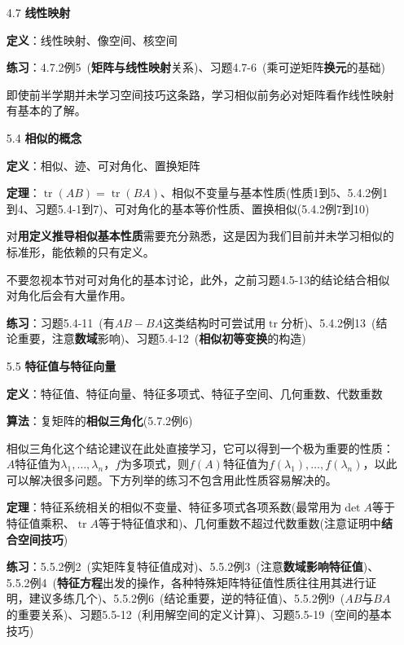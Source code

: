 \documentclass[a4paper,UTF8,fontset=windows]{ctexart}
\DeclareMathOperator{\tr}{tr}
\newcommand*{\note}{\noindent *}
\begin{document}
\begin{enumerate}
    \item[4.7] \textbf{线性映射}
    
    \textbf{定义}：线性映射、像空间、核空间

    \textbf{练习}：4.7.2例5\ (\textbf{矩阵与线性映射}关系)、习题4.7-6\ (乘可逆矩阵\textbf{换元}的基础)

    \note 即使前半学期并未学习空间技巧这条路，学习相似前务必对矩阵看作线性映射有基本的了解。

    \item[5.4] \textbf{相似的概念}
    
    \textbf{定义}：相似、迹、可对角化、置换矩阵

    \textbf{定理}：$\tr(AB)=\tr(BA)$、相似不变量与基本性质(性质1到5、5.4.2例1到4、习题5.4-1到7)、可对角化的基本等价性质、置换相似(5.4.2例7到10)

    \note 对\textbf{用定义推导相似基本性质}需要充分熟悉，这是因为我们目前并未学习相似的标准形，能依赖的只有定义。

    \note 不要忽视本节对可对角化的基本讨论，此外，之前习题4.5-13的结论结合相似对角化后会有大量作用。

    \textbf{练习}：习题5.4-11\ (有$AB-BA$这类结构时可尝试用$\tr$分析)、5.4.2例13\ (结论重要，注意\textbf{数域}影响)、习题5.4-12\ (\textbf{相似初等变换}的构造)

    \item[5.5] \textbf{特征值与特征向量}
    
    \textbf{定义}：特征值、特征向量、特征多项式、特征子空间、几何重数、代数重数

    \textbf{算法}：复矩阵的\textbf{相似三角化}(5.7.2例6)

    \note 相似三角化这个结论建议在此处直接学习，它可以得到一个极为重要的性质：$A$特征值为$\lambda_1,\dots,\lambda_n$，$f$为多项式，则$f(A)$特征值为$f(\lambda_1),\dots,f(\lambda_n)$，以此可以解决很多问题。下方列举的练习不包含用此性质容易解决的。

    \textbf{定理}：特征系统相关的相似不变量、特征多项式各项系数(最常用为$\det A$等于特征值乘积、$\tr A$等于特征值求和)、几何重数不超过代数重数(注意证明中\textbf{结合空间技巧})

    \textbf{练习}：5.5.2例2\ (实矩阵复特征值成对)、5.5.2例3\ (注意\textbf{数域影响特征值})、5.5.2例4\ (\textbf{特征方程}出发的操作，各种特殊矩阵特征值性质往往用其进行证明，建议多练几个)、5.5.2例6\ (结论重要，逆的特征值)、5.5.2例9\ ($AB$与$BA$的重要关系)、习题5.5-12\ (利用解空间的定义计算)、习题5.5-19\ (空间的基本技巧)


\end{enumerate}
\end{document}
